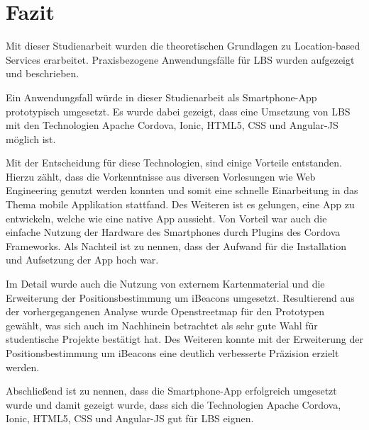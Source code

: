 \newpage
\section{Fazit}


Mit dieser Studienarbeit wurden die theoretischen Grundlagen zu Location-based Services erarbeitet. 
Praxisbezogene Anwendungsfälle für LBS wurden aufgezeigt und beschrieben.

Ein Anwendungsfall würde in dieser Studienarbeit als Smartphone-App prototypisch umgesetzt. 
Es wurde dabei gezeigt, dass eine Umsetzung von LBS mit den Technologien Apache Cordova, Ionic, HTML5, CSS und Angular-JS möglich ist. 

Mit der Entscheidung für diese Technologien, sind einige Vorteile entstanden. Hierzu zählt, dass die Vorkenntnisse aus diversen Vorlesungen wie Web Engineering genutzt werden konnten und somit eine schnelle Einarbeitung in das Thema mobile Applikation stattfand. Des Weiteren ist es gelungen, eine App zu entwickeln, welche wie eine native App aussieht. Von Vorteil war auch die einfache Nutzung der Hardware des Smartphones durch Plugins des Cordova Frameworks. Als Nachteil ist zu nennen, dass der Aufwand für die Installation und Aufsetzung der App hoch war.

Im Detail wurde auch die Nutzung von externem Kartenmaterial und die Erweiterung der Positionsbestimmung um iBeacons umgesetzt.
Resultierend aus der vorhergegangenen Analyse wurde Openstreetmap für den Prototypen gewählt, was sich auch im Nachhinein betrachtet als sehr gute Wahl für studentische Projekte bestätigt hat. Des Weiteren konnte mit der Erweiterung der Positionsbestimmung um iBeacons eine deutlich verbesserte Präzision erzielt werden. 

Abschließend ist zu nennen, dass die Smartphone-App erfolgreich umgesetzt wurde und damit gezeigt wurde, dass sich die Technologien Apache Cordova, Ionic, HTML5, CSS und Angular-JS gut für LBS eignen.


